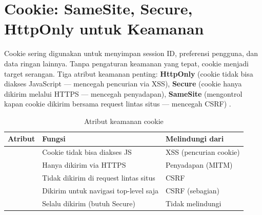 \section{Cookie: SameSite, Secure, HttpOnly untuk Keamanan}

Cookie sering digunakan untuk menyimpan session ID, preferensi pengguna, dan data ringan lainnya. Tanpa pengaturan keamanan yang tepat, cookie menjadi target serangan. Tiga atribut keamanan penting: \textbf{HttpOnly} (cookie tidak bisa diakses JavaScript --- mencegah pencurian via XSS), \textbf{Secure} (cookie hanya dikirim melalui HTTPS --- mencegah penyadapan), \textbf{SameSite} (mengontrol kapan cookie dikirim bersama request lintas situs --- mencegah CSRF) \cite{owaspCsrf}.

\begin{table}[ht]
\centering
\begin{tabular}{|P{2.5cm}|P{5cm}|P{5cm}|}
\hline
\textbf{Atribut} & \textbf{Fungsi} & \textbf{Melindungi dari} \\
\hline
{} & Cookie tidak bisa diakses JS & XSS (pencurian cookie) \\
\hline
{} & Hanya dikirim via HTTPS & Penyadapan (MITM) \\
\hline
{} & Tidak dikirim di request lintas situs & CSRF \\
\hline
{} & Dikirim untuk navigasi top-level saja & CSRF (sebagian) \\
\hline
{} & Selalu dikirim (butuh Secure) & Tidak melindungi \\
\hline
\end{tabular}
\caption{Atribut keamanan cookie}
\end{table}

